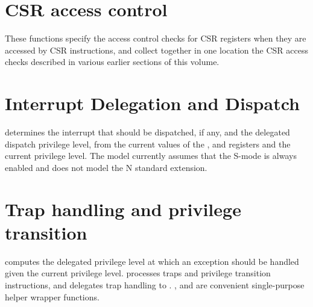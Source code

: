 \section{CSR access control}
\label{s:priv-sail-csr-access}

These functions specify the access control checks for CSR registers
when they are accessed by CSR instructions, and collect together in
one location the CSR access checks described in various earlier
sections of this volume.

\begin{formalspec}
  \sailfncsrAccess
  \sailfncsrPriv
  \sailfnisCSRDefined
  \sailfncheckCSRAccess
  \sailfncheckTVMSATP
  \sailfncheckCounteren
  \sailfncheckCSR
\end{formalspec}

\section{Interrupt Delegation and Dispatch}
\label{s:priv-sail-intrs}

 determines the interrupt that should be
dispatched, if any, and the delegated dispatch privilege level, from
the current values of the ,  and
 registers and the current privilege level.  The
model currently assumes that the S-mode is always enabled and does not
model the N standard extension.

\begin{formalspec}
  \sailfnfindPendingInterrupt
  \sailfncurInterrupt
\end{formalspec}

\section{Trap handling and privilege transition}
\label{s:priv-sail-traps}

 computes the delegated privilege
level at which an exception should be handled given the current
privilege level.   processes traps and
privilege transition instructions, and delegates trap handling to
.  ,
 and  are
convenient single-purpose helper wrapper functions.

\begin{formalspec}
  \sailfnexceptionDelegatee
  \sailfnhandleTrap
  \sailfnhandleException
  \sailfnhandleMemException
  \sailfnhandleInterrupt
  \sailfnhandleIllegal
\end{formalspec}

